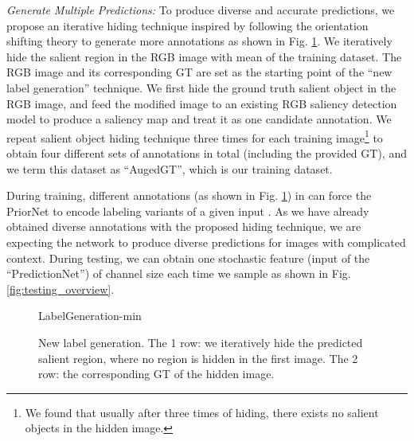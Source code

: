 \documentclass[10pt,twocolumn,letterpaper]{article}
\begin{document}
\noindent\textit{Generate Multiple Predictions:} To produce diverse and accurate predictions, we propose an iterative hiding technique inspired by \cite{hide_and_seek-iccv2017} following the orientation shifting theory \cite{ITTI20001489} to generate more
annotations as shown in Fig. \ref{fig:iterative_label_generation}. We iteratively hide the salient region in the RGB image with mean of the training dataset. The RGB image and its corresponding GT are set as the starting point of the \enquote{new label generation} technique. We first hide the ground truth salient object in the RGB image, and feed the modified image to an existing RGB saliency detection model \cite{BASNet_Sal} to produce a saliency map and treat it as one candidate annotation.
We repeat salient object hiding technique three times for each training image\footnote{We found that usually after three times of hiding, there exists no salient objects in the hidden image.} to obtain four different sets of annotations in total (including the provided GT), and we term this dataset as \enquote{AugedGT}, which is our training dataset.




During training, different annotations (as shown in Fig. \ref{fig:iterative_label_generation}) in  can force the PriorNet  to encode labeling variants of a given input . As we have already obtained diverse annotations with the proposed hiding technique,
we are expecting the network to produce diverse predictions for images with complicated context. During testing, we can obtain one stochastic feature  (input of the \enquote{PredictionNet}) of channel size  each time we sample as shown in Fig. \ref{fig:testing_overview}.



\begin{figure}[thp]
	\centering
    \small
	\begin{overpic}[width=1.0\columnwidth]{LabelGeneration-min}
    \end{overpic}
    \caption{New label generation. The 1 row: we iteratively hide the predicted salient region, where no region is hidden in the first image. The 2 row: the corresponding GT of the hidden image.}
   \label{fig:iterative_label_generation}
   \vspace{-1mm}
\end{figure}
\end{document}
